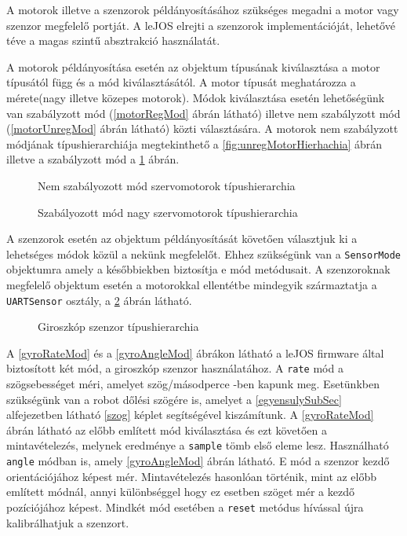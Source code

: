 A motorok illetve a szenzorok példányosításához szükséges megadni a motor vagy szenzor megfelelő portját. A leJOS elrejti a szenzorok implementációját, lehetővé téve a magas szintű absztrakció használatát.

A motorok példányosítása esetén az objektum típusának kiválasztása a motor típusától függ és a mód kiválasztásától. A motor típusát meghatározza a mérete(nagy illetve közepes motorok). Módok kiválasztása esetén lehetőségünk van szabályzott mód (\ref{motorRegMod} ábrán látható) illetve nem szabályzott mód  (\ref{motorUnregMod} ábrán látható) közti választására. A motorok nem szabályzott módjának típushierarchiája megtekinthető a \ref{fig:unregMotorHierhachia} ábrán illetve a szabályzott mód a \ref{fig:regMotorHierhachia} ábrán.

\begin{figure}[!htb]
	\centering
	\captionsetup{justification=centering,margin=1.5cm}
	\caption{Nem szabályozott mód szervomotorok típushierarchia}
	\label{fig:unregMotorHierhachia}
	\endminipage
	\captionsetup{margin=1.5cm}
	\caption{Szabályozott mód nagy szervomotorok típushierarchia}
	\label{fig:regMotorHierhachia}
	\endminipage
\end{figure}
 
 A szenzorok esetén az objektum példányosítását követően választjuk ki a lehetséges módok közül a nekünk megfelelőt. Ehhez szükségünk van a \texttt{SensorMode} objektumra amely a későbbiekben biztosítja e mód metódusait. A szenzoroknak megfelelő objektum esetén a motorokkal ellentétbe mindegyik származtatja a \texttt{UARTSensor} osztály, a \ref{fig:gyroHierhachia} ábrán látható.

\begin{figure}[!htb]
	\centering
	\caption{Giroszkóp szenzor típushierarchia}
	\label{fig:gyroHierhachia}
\end{figure}


A \ref{gyroRateMod} és a \ref{gyroAngleMod} ábrákon látható a leJOS firmware által biztosított két mód, a giroszkóp szenzor használatához. A \texttt{rate} mód a szögsebességet méri, amelyet szög/másodperce -ben kapunk meg. Esetünkben szükségünk van a robot dőlési szögére is, amelyet a \ref{egyensulySubSec} alfejezetben látható \ref{szog} képlet segítségével  kiszámítunk. A \ref{gyroRateMod} ábrán látható az előbb említett mód kiválasztása és ezt követően a mintavételezés, melynek eredménye a \texttt{sample} tömb első eleme lesz. Használható \texttt{angle} módban is, amely \ref{gyroAngleMod} ábrán látható. E mód a szenzor kezdő orientációjához képest mér. Mintavételezés hasonlóan történik, mint az előbb említett módnál, annyi különbséggel hogy ez esetben szöget mér a kezdő pozíciójához képest. Mindkét mód esetében a \texttt{reset} metódus hívással újra kalibrálhatjuk a szenzort.


